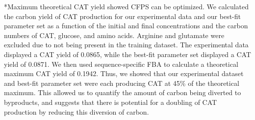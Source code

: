 \documentclass[12pt]{article}
\makeatletter
\renewcommand\subsection{\@startsection
	{subsection}{2}{0mm}
	{-0.05in}
	{-0.5\baselineskip}
	{\normalfont\normalsize\bfseries}}
\makeatother
\begin{document}
\subsection*{Maximum theoretical CAT yield showed CFPS can be optimized.}
We calculated the carbon yield of CAT production for our experimental data and our best-fit parameter set as a function of the initial and final concentrations and the carbon numbers of CAT, glucose, and amino acids.
Arginine and glutamate were excluded due to not being present in the training dataset.
The experimental data displayed a CAT yield of 0.0865, while the best-fit parameter set displayed a CAT yield of 0.0871.
We then used sequence-specific FBA to calculate a theoretical maximum CAT yield of 0.1942.
Thus, we showed that our experimental dataset and best-fit parameter set were each producing CAT at 45\% of the theoretical maximum.
This allowed us to quantify the amount of carbon being diverted to byproducts, and suggests that there is potential for a doubling of CAT production by reducing this diversion of carbon.
\end{document}
